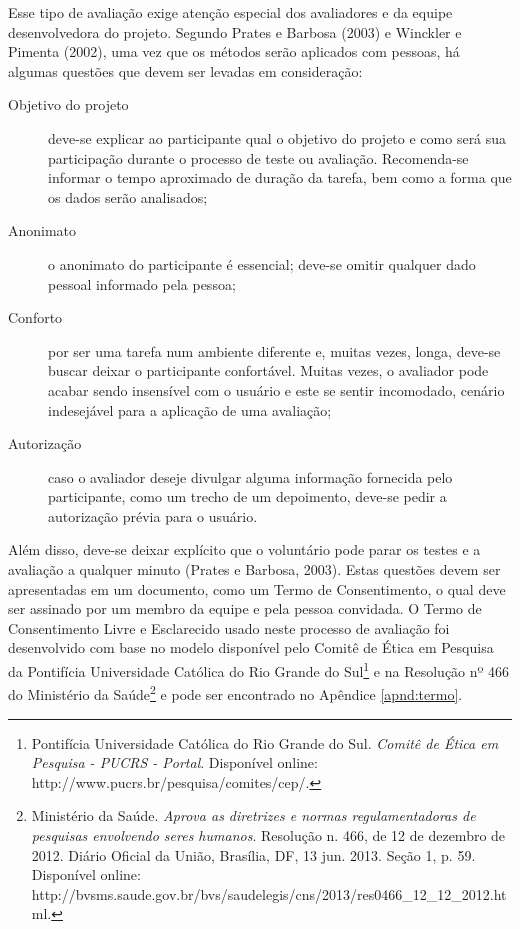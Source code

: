 Esse tipo de avaliação exige atenção especial dos avaliadores e da equipe desenvolvedora do projeto. Segundo Prates e Barbosa (2003) e Winckler e Pimenta (2002), uma vez que os métodos serão aplicados com pessoas, há algumas questões que devem ser levadas em consideração:
    \begin{description}
        \item [Objetivo do projeto] deve-se explicar ao participante qual o objetivo do projeto e como será sua participação durante o processo de teste ou avaliação. Recomenda-se informar o tempo aproximado de duração da tarefa, bem como a forma que os dados serão analisados;
        \item [Anonimato] o anonimato do participante é essencial; deve-se omitir qualquer dado pessoal informado pela pessoa;
        \item [Conforto] por ser uma tarefa num ambiente diferente e, muitas vezes, longa, deve-se buscar deixar o participante confortável. Muitas vezes, o avaliador pode acabar sendo insensível com o usuário e este se sentir incomodado, cenário indesejável para a aplicação de uma avaliação;
        \item [Autorização] caso o avaliador deseje divulgar alguma informação fornecida pelo participante, como um trecho de um depoimento, deve-se pedir a autorização prévia para o usuário.
    \end{description}
Além disso, deve-se deixar explícito que o voluntário pode parar os testes e a avaliação a qualquer minuto (Prates e Barbosa, 2003). Estas questões devem ser apresentadas em um documento, como um Termo de Consentimento, o qual deve ser assinado por um membro da equipe e pela pessoa convidada. O Termo de Consentimento Livre e Esclarecido usado neste processo de avaliação foi desenvolvido com base no modelo disponível pelo Comitê de Ética em Pesquisa da Pontifícia Universidade Católica do Rio Grande do Sul\footnote{Pontifícia Universidade Católica do Rio Grande do Sul. \emph{Comitê de Ética em Pesquisa - PUCRS - Portal}. Disponível online: http://www.pucrs.br/pesquisa/comites/cep/.} e na Resolução nº 466 do Ministério da Saúde\footnote{Ministério da Saúde. \emph{Aprova as diretrizes e normas regulamentadoras de pesquisas envolvendo seres humanos}. Resolução n. 466, de 12 de dezembro de 2012. Diário Oficial da União, Brasília, DF, 13 jun. 2013. Seção 1, p. 59. Disponível online: http://bvsms.saude.gov.br/bvs/saudelegis/cns/2013/res0466\_12\_12\_2012.html.} e pode ser encontrado no Apêndice \ref{apnd:termo}.
\color{black}